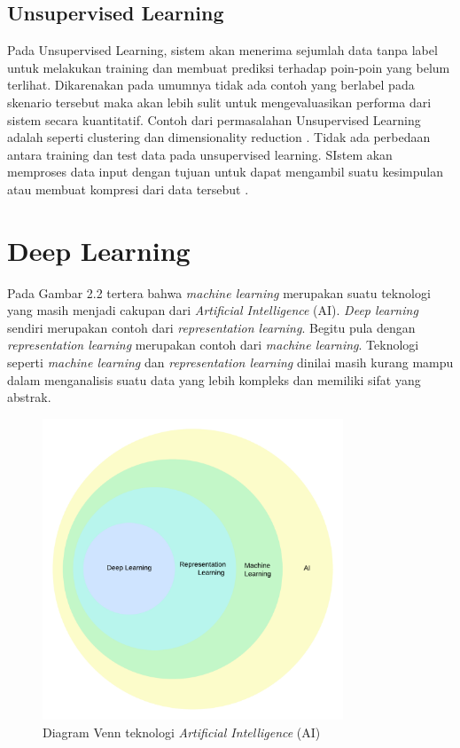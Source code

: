 \subsection{Unsupervised Learning}
\label{sec:unsupervisedlearning}
Pada Unsupervised Learning, sistem akan menerima sejumlah data tanpa label untuk melakukan training dan membuat prediksi terhadap poin-poin yang belum terlihat. Dikarenakan pada umumnya tidak ada contoh yang berlabel pada skenario tersebut maka akan lebih sulit untuk mengevaluasikan performa dari sistem secara kuantitatif. Contoh dari permasalahan Unsupervised Learning adalah seperti clustering dan dimensionality reduction \citep{mohri2012foundations}. Tidak ada perbedaan antara training dan test data pada unsupervised learning. SIstem akan memproses data input dengan tujuan untuk dapat mengambil suatu kesimpulan atau membuat kompresi dari data tersebut \citep{shalev2014understanding}.

\section{Deep Learning}
\label{sec:deeplearning}

Pada Gambar 2.2 tertera bahwa \emph{machine learning} merupakan suatu teknologi yang masih menjadi cakupan dari \emph{Artificial Intelligence} (AI). \emph{Deep learning} sendiri merupakan contoh dari \emph{representation learning}. Begitu pula dengan \emph{representation learning} merupakan contoh dari \emph{machine learning}. Teknologi seperti \emph{machine learning} dan \emph{representation learning} dinilai masih kurang mampu dalam menganalisis suatu data yang lebih kompleks dan memiliki sifat yang abstrak.

\begin{figure}[H]
	\centering
	
	\includegraphics[width=0.8\textwidth]{gambar/tipus_gambar_deep learning venn}
	
	\caption{Diagram Venn teknologi \emph{Artificial Intelligence} (AI)}
	\label{fig:deeplearningvenn}
\end{figure}

